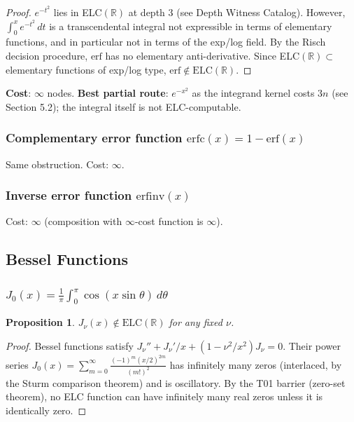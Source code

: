 \documentclass[11pt]{article}
\newtheorem{proposition}[theorem]{Proposition}
\begin{document}
\begin{proof}
$e^{-t^2}$ lies in ELC$(\mathbb{R})$ at depth 3 (see Depth Witness Catalog).
However, $\int_0^x e^{-t^2}\,dt$ is a transcendental integral not expressible in terms
of elementary functions, and in particular not in terms of the exp/log field.
By the Risch decision procedure, $\mathrm{erf}$ has no elementary anti-derivative.
Since ELC$(\mathbb{R})\subset$ elementary functions of exp/log type,
$\mathrm{erf}\notin\mathrm{ELC}(\mathbb{R})$.
\end{proof}

\textbf{Cost}: $\infty$ nodes. \textbf{Best partial route}: $e^{-x^2}$ as the integrand kernel
costs $3n$ (see Section 5.2); the integral itself is not ELC-computable.

\subsubsection{Complementary error function $\mathrm{erfc}(x) = 1-\mathrm{erf}(x)$}

Same obstruction. Cost: $\infty$.

\subsubsection{Inverse error function $\mathrm{erfinv}(x)$}

Cost: $\infty$ (composition with $\infty$-cost function is $\infty$).

\subsection{Bessel Functions}

\subsubsection{$J_0(x) = \frac{1}{\pi}\int_0^\pi\cos(x\sin\theta)\,d\theta$}

\begin{proposition}
$J_\nu(x)\notin\mathrm{ELC}(\mathbb{R})$ for any fixed $\nu$.
\end{proposition}

\begin{proof}
Bessel functions satisfy $J_\nu'' + J_\nu'/x + (1-\nu^2/x^2)J_\nu = 0$.
Their power series $J_0(x)=\sum_{m=0}^\infty\frac{(-1)^m(x/2)^{2m}}{(m!)^2}$
has infinitely many zeros (interlaced, by the Sturm comparison theorem) and is
oscillatory. By the T01 barrier (zero-set theorem), no ELC function can have
infinitely many real zeros unless it is identically zero.
\end{proof}
\end{document}

